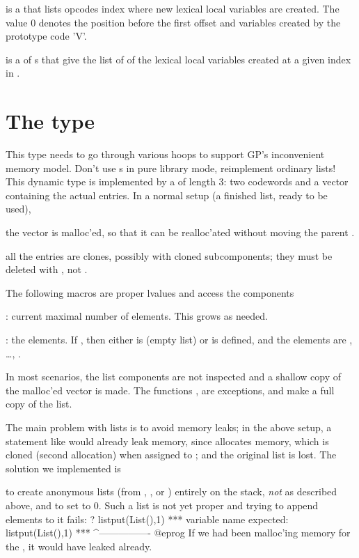  is a  that lists opcodes index where new lexical
local variables are created. The value $0$ denotes the position before the
first offset and variables created by the prototype code 'V'.

 is a  of s that give the list of
 of the lexical local variables created at a given index in
.

\section{The type } This type needs to go
through various hoops to support GP's inconvenient memory model. Don't
use s in pure library mode, reimplement ordinary lists! This
dynamic type is implemented by a  of length 3: two codewords and a
vector containing the actual entries. In a normal setup (a finished list,
ready to be used),

\item the vector is malloc'ed, so that it can be realloc'ated without moving
the parent .

\item all the entries are clones, possibly with cloned subcomponents; they
must be deleted with , not .

The following macros are proper lvalues and access the components

: current maximal number of elements. This grows
as needed.

: the elements. If , then
either  is  (empty list) or  is defined, and
the elements are , \dots, .

In most  scenarios, the list components are not inspected
and a shallow copy of the malloc'ed vector is made. The functions
,  are exceptions, and make a full copy of
the list.

The main problem with lists is to avoid memory leaks; in the above setup,
a statement like  would already leak memory, since
 allocates memory, which is cloned (second allocation) when
assigned to ; and the original list is lost. The solution we
implemented is

\item to create anonymous lists (from , ,
 or ) entirely on the stack, \emph{not} as described
above, and to set  to $0$. Such a list is not yet proper and
trying to append elements to it fails:
\bprog
? listput(List(),1)
  ***   variable name expected: listput(List(),1)
  ***                                   ^----------------
@eprog\noindent
If we had been malloc'ing memory for the
, it would have leaked already.

